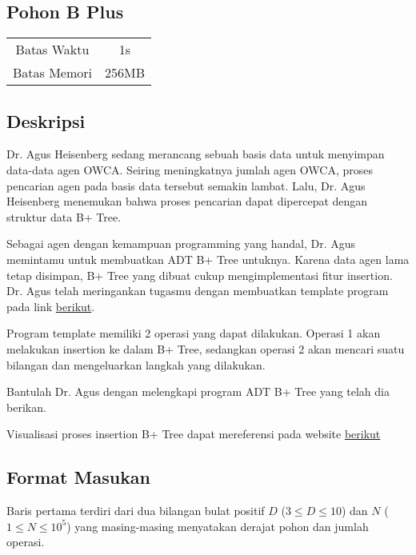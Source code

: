 \documentclass{article}
\begin{document}
\begin{center}

    
    \section*{Pohon B Plus} %

    \begin{tabular}{ | c c | }
        \hline
        Batas Waktu  & 1s \\    %
        Batas Memori & 256MB \\  %
        \hline
    \end{tabular}
\end{center}

\subsection*{Deskripsi}

Dr. Agus Heisenberg sedang merancang sebuah basis data untuk menyimpan data-data agen OWCA. Seiring meningkatnya jumlah agen OWCA, proses pencarian agen pada basis data tersebut semakin lambat. Lalu, Dr. Agus Heisenberg menemukan bahwa proses pencarian dapat dipercepat dengan struktur data B+ Tree. 

Sebagai agen dengan kemampuan programming yang handal, Dr. Agus memintamu untuk membuatkan ADT B+ Tree untuknya. Karena data agen lama tetap disimpan, B+ Tree yang dibuat cukup mengimplementasi fitur insertion. Dr. Agus telah meringankan tugasmu dengan membuatkan template program pada link \href{https://drive.google.com/drive/folders/19CcSmHoxypupEgl6w9DckooEcUfqM3qY?usp=sharing}{berikut}.

Program template memiliki 2 operasi yang dapat dilakukan. Operasi 1 akan melakukan insertion ke dalam B+ Tree, sedangkan operasi 2 akan mencari suatu bilangan dan mengeluarkan langkah yang dilakukan.

Bantulah Dr. Agus dengan melengkapi program ADT B+ Tree yang telah dia berikan.

Visualisasi proses insertion B+ Tree dapat mereferensi pada website \href{https://www.cs.usfca.edu/~galles/visualization/BPlusTree.html}{berikut}

\subsection*{Format Masukan}

Baris pertama terdiri dari dua bilangan bulat positif $D$ ($3 \leq D \leq 10$) dan $N$ ($1 \leq N \leq 10^{5}$) yang masing-masing menyatakan derajat pohon dan jumlah operasi.
\end{document}

